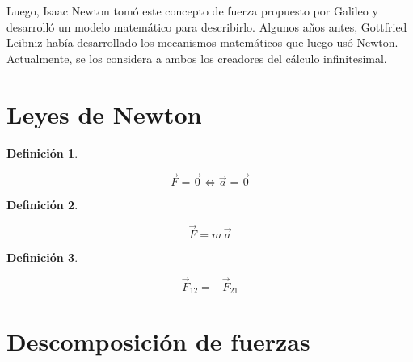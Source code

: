 \documentclass[a5paper,12pt,twoside]{book}
\newtheorem{defn}{{Definición}}[chapter]
\begin{document}
Luego, Isaac Newton tomó este concepto de fuerza propuesto por Galileo y desarrolló un modelo matemático para describirlo. Algunos años antes, Gottfried Leibniz había desarrollado los mecanismos matemáticos que luego usó Newton. Actualmente, se los considera a ambos los creadores del cálculo infinitesimal.


\section{Leyes de Newton}

\begin{mdframed}[style=MyFrame1]
    \begin{defn}
        \label{defn:NewtonFirstLaw}
    \end{defn}
    \begin{equation*}
        \Vec{F} = \vec{0} \iff \Vec{a} = \vec{0}
    \end{equation*}
\end{mdframed}

\begin{mdframed}[style=MyFrame1]
    \begin{defn}
        \label{defn:NewtonSecondLaw}
    \end{defn}
    \begin{equation*}
        \Vec{F} = m \, \Vec{a}
    \end{equation*}
\end{mdframed}

\begin{mdframed}[style=MyFrame1]
    \begin{defn}
        \label{defn:NewtonThirdLaw}
    \end{defn}
    \begin{equation*}
        \Vec{F}_{12} = -\Vec{F}_{21}
    \end{equation*}
\end{mdframed}


\section{Descomposición de fuerzas}
\end{document}
